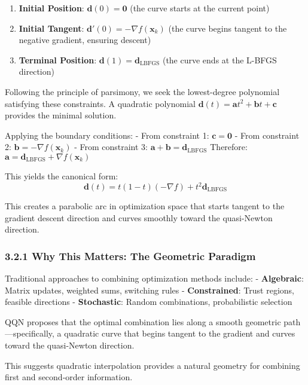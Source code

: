 \begin{enumerate}
\def\labelenumi{\arabic{enumi}.}
\item
  \textbf{Initial Position}: \(\mathbf{d}(0) = \mathbf{0}\) (the curve starts at the current point)
\item
  \textbf{Initial Tangent}: \(\mathbf{d}'(0) = -\nabla f(\mathbf{x}_k)\) (the curve begins tangent to the negative
  gradient, ensuring descent)
\item
  \textbf{Terminal Position}: \(\mathbf{d}(1) = \mathbf{d}_{\text{LBFGS}}\) (the curve ends at the L-BFGS direction)
\end{enumerate}

Following the principle of parsimony, we seek the lowest-degree polynomial satisfying these constraints. A quadratic
polynomial \(\mathbf{d}(t) = \mathbf{a}t^2 + \mathbf{b}t + \mathbf{c}\) provides the minimal solution.

Applying the boundary conditions:
- From constraint 1: \(\mathbf{c} = \mathbf{0}\)
- From constraint 2: \(\mathbf{b} = -\nabla f(\mathbf{x}_k)\)
- From constraint 3: \(\mathbf{a} + \mathbf{b} = \mathbf{d}_{\text{LBFGS}}\)
Therefore: \(\mathbf{a} = \mathbf{d}_{\text{LBFGS}} + \nabla f(\mathbf{x}_k)\)

This yields the canonical form:
\[\mathbf{d}(t) = t(1-t)(-\nabla f) + t^2 \mathbf{d}_{\text{LBFGS}}\]

This creates a parabolic arc in optimization space that starts tangent to the gradient descent direction and curves
smoothly toward the quasi-Newton direction.

\hypertarget{why-this-matters-the-geometric-paradigm}{%
\subsubsection{3.2.1 Why This Matters: The Geometric Paradigm}\label{why-this-matters-the-geometric-paradigm}}

Traditional approaches to combining optimization methods include:
- \textbf{Algebraic}: Matrix updates, weighted sums, switching rules
- \textbf{Constrained}: Trust regions, feasible directions
- \textbf{Stochastic}: Random combinations, probabilistic selection

QQN proposes that the optimal combination lies along a smooth geometric path---specifically, a quadratic curve that
begins tangent to the gradient and curves toward the quasi-Newton direction.

This suggests quadratic interpolation provides a natural geometry for combining first and second-order information.

